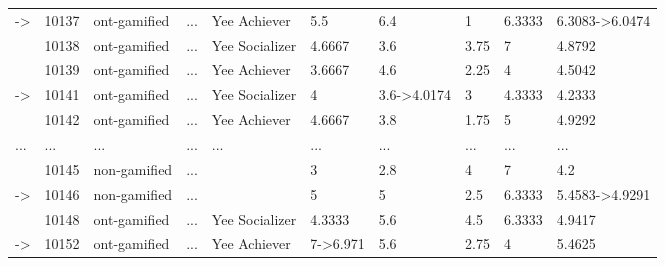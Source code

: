 \documentclass[6pt,a4paper]{article}
\begin{document}
\begin{landscape}
{\begin{longtable}{llllllllll}
-\textgreater &10137&ont-gamified&...&Yee Achiever&5.5&6.4&1&6.3333&6.3083-\textgreater 6.0474\tabularnewline
&10138&ont-gamified&...&Yee Socializer&4.6667&3.6&3.75&7&4.8792\tabularnewline
&10139&ont-gamified&...&Yee Achiever&3.6667&4.6&2.25&4&4.5042\tabularnewline
-\textgreater &10141&ont-gamified&...&Yee Socializer&4&3.6-\textgreater 4.0174&3&4.3333&4.2333\tabularnewline
&10142&ont-gamified&...&Yee Achiever&4.6667&3.8&1.75&5&4.9292\tabularnewline
...&...&...&...&...&...&...&...&...&...\tabularnewline
&10145&non-gamified&...&&3&2.8&4&7&4.2\tabularnewline
-\textgreater &10146&non-gamified&...&&5&5&2.5&6.3333&5.4583-\textgreater 4.9291\tabularnewline
&10148&ont-gamified&...&Yee Socializer&4.3333&5.6&4.5&6.3333&4.9417\tabularnewline
-\textgreater &10152&ont-gamified&...&Yee Achiever&7-\textgreater 6.971&5.6&2.75&4&5.4625\tabularnewline
\hline
\end{longtable}}

\end{landscape}
\end{document}
